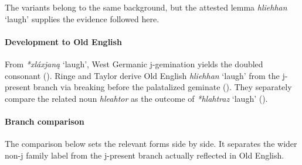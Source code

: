 \documentclass[
  british,
  a4paper,
]{article}
\providecommand{\Recon}[1]{\emph{*#1}}
\begin{document}
The variants belong to the same background, but the attested lemma
{\emph{hliehhan}} `laugh' supplies the evidence followed here.

\paragraph{Development to Old
English}\label{development-to-old-english-94}

From \Recon{xláxjaną} `laugh', West Germanic j-gemination yields the
doubled consonant (). Ringe and Taylor derive Old English {\emph{hliehhan}} `laugh'
from the j-present branch via breaking before the palatalized geminate
(). They
separately compare the related noun \emph{hleahtor} as the outcome of
\Recon{hlahtraz} `laugh' ().

\paragraph{Branch comparison}\label{branch-comparison}

The comparison below sets the relevant forms side by side. It separates
the wider non-j family label from the j-present branch actually
reflected in Old English.
\end{document}
